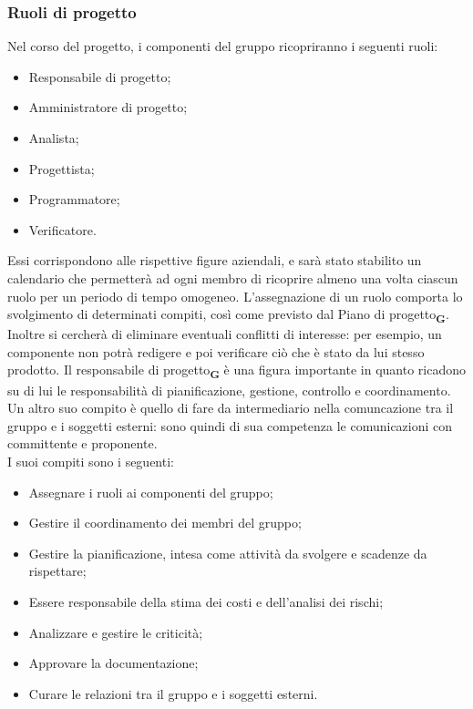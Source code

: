 \subsubsection{Ruoli di progetto}
Nel corso del progetto, i componenti del gruppo ricopriranno i seguenti ruoli:
\begin {itemize}
    \item Responsabile di progetto;
    \item Amministratore di progetto;
    \item Analista;
    \item Progettista;
    \item Programmatore;
    \item Verificatore.
\end {itemize}
Essi corrispondono alle rispettive figure aziendali, e sarà stato stabilito un calendario che permetterà ad ogni membro di ricoprire almeno una volta ciascun ruolo per un periodo di tempo omogeneo. L’assegnazione di un ruolo comporta lo svolgimento di determinati compiti, così come previsto dal Piano di progetto\textsubscript{\textbf{G}}. Inoltre si cercherà di eliminare eventuali conflitti di interesse: per esempio, un componente non potrà redigere e poi verificare ciò che è stato da lui stesso prodotto.
Il responsabile di progetto\textsubscript{\textbf{G}} è una figura importante in quanto ricadono su di lui le responsabilità di pianificazione, gestione, controllo e coordinamento. Un altro suo compito è quello di fare da intermediario nella comuncazione tra il gruppo e i soggetti esterni: sono quindi di sua competenza le comunicazioni con committente e proponente.\\
I suoi compiti sono i seguenti:
\begin {itemize}
    \item Assegnare i ruoli ai componenti del gruppo;
    \item Gestire il coordinamento dei membri del gruppo;
    \item Gestire la pianificazione, intesa come attività da svolgere e scadenze da rispettare;
    \item Essere responsabile della stima dei costi e dell’analisi dei rischi;
    \item Analizzare e gestire le criticità;
    \item Approvare la documentazione;
    \item Curare le relazioni tra il gruppo e i soggetti esterni.
\end {itemize}
